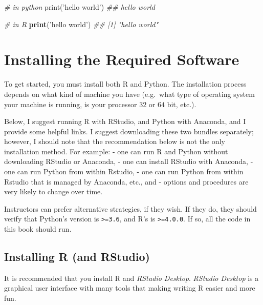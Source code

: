 \documentclass[12pt,krantz2]{krantz}
\makeatletter
\newenvironment{Shaded}{\begin{snugshade}}{\end{snugshade}}
\newcommand{\BuiltInTok}[1]{#1}
\newcommand{\CommentTok}[1]{\textcolor[rgb]{0.37,0.37,0.37}{\textit{#1}}}
\newcommand{\KeywordTok}[1]{\textcolor[rgb]{0.27,0.27,0.27}{\textbf{#1}}}
\newcommand{\NormalTok}[1]{#1}
\newcommand{\StringTok}[1]{\textcolor[rgb]{0.5,0.5,0.5}{#1}}
\newenvironment{kframe}{%
\medskip{}
\setlength{\fboxsep}{.8em}
 \def\at@end@of@kframe{}%
 \ifinner\ifhmode%
  \def\at@end@of@kframe{\end{minipage}}%
  \begin{minipage}{\columnwidth}%
 \fi\fi%
 \def\FrameCommand##1{\hskip\@totalleftmargin \hskip-\fboxsep
 \colorbox{shadecolor}{##1}\hskip-\fboxsep
     \hskip-\linewidth \hskip-\@totalleftmargin \hskip\columnwidth}%
 \MakeFramed {\advance\hsize-\width
   \@totalleftmargin\z@ \linewidth\hsize
   \@setminipage}}%
 {\par\unskip\endMakeFramed%
 \at@end@of@kframe}
\renewenvironment{Shaded}{\begin{kframe}}{\end{kframe}}
\makeatother
\begin{document}
\begin{Shaded}
\begin{Highlighting}[]
\CommentTok{# in python}
\BuiltInTok{print}\NormalTok{(}\StringTok{'hello world'}\NormalTok{)}
\CommentTok{## hello world}
\end{Highlighting}
\end{Shaded}

\begin{Shaded}
\begin{Highlighting}[]
\CommentTok{# in R}
\KeywordTok{print}\NormalTok{(}\StringTok{'hello world'}\NormalTok{)}
\CommentTok{## [1] "hello world"}
\end{Highlighting}
\end{Shaded}

\hypertarget{installing-the-required-software}{%
\section*{Installing the Required Software}\label{installing-the-required-software}}


To get started, you must install both R and Python. The installation process depends on what kind of machine you have (e.g.~what type of operating system your machine is running, is your processor \(32\) or \(64\) bit, etc.).

Below, I suggest running R with RStudio, and Python with Anaconda, and I provide some helpful links. I suggest downloading these two bundles separately; however, I should note that the recommendation below is not the only installation method. For example:
- one can run R and Python without downloading RStudio or Anaconda,
- one can install RStudio with Anaconda,
- one can run Python from within Rstudio,
- one can run Python from within Rstudio that is managed by Anaconda, etc., and
- options and procedures are very likely to change over time.

Instructors can prefer alternative strategies, if they wish. If they do, they should verify that Python's version is \texttt{\textgreater{}=3.6}, and R's is \texttt{\textgreater{}=4.0.0}. If so, all the code in this book should run.

\hypertarget{installing-r-and-rstudio}{%
\subsection*{Installing R (and RStudio)}\label{installing-r-and-rstudio}}


It is recommended that you install R and \emph{RStudio Desktop}. \emph{RStudio Desktop} is a graphical user interface with many tools that making writing R easier and more fun.
\end{document}

